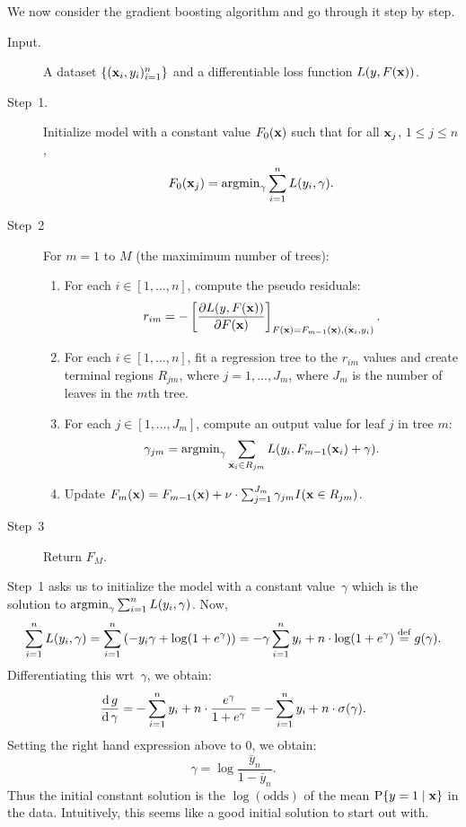 We now consider the gradient boosting algorithm and go through it step by step. 
\begin{description}
    \item[Input.] A dataset $\{(\mathbf{x}_i, y_i)_{i = 1}^{n}\}$ and a 
        differentiable loss function $L(y, F(\mathbf{x}))$.
    
    \item[Step~1.] Initialize model with a constant value $F_0(\mathbf{x})$ such
        that for all $\mathbf{x}_j$, $1 \leq j \leq n$,
        \[
            F_0(\mathbf{x}_j) = \operatorname{argmin}_{\gamma} \sum_{i = 1}^{n} L(y_i, \gamma).
        \]   
    \item[Step~2] For $m = 1$ to $M$ (the maximimum number of trees):
        \begin{enumerate}
            \item For each $i \in [1, \ldots, n]$, compute the pseudo residuals:
                \[
                    r_{i m} = 
                            - \left [ 
                                \frac{\partial L(y, F(\mathbf{x}))}{\partial F(\mathbf{x})} 
                              \right ]_{F(\mathbf{x}) = F_{m - 1}(\mathbf{x}), (\mathbf{x}_i, y_i)}.
                \]
            \item For each $i \in [1, \ldots, n]$, fit a regression tree to the 
                $r_{i m}$ values and create terminal regions $R_{j m}$, where 
                $j = 1, \ldots, J_m$, where $J_m$ is the number of leaves in the 
                $m$th tree.
            \item For each $j \in [1, \ldots, J_m]$, compute an output value for 
                leaf $j$ in tree $m$:
                \[
                    \gamma_{j m} = \operatorname{argmin}_{\gamma} 
                            \sum_{\mathbf{x}_i \in R_{j m}} L(y_i, F_{m - 1}(\mathbf{x}_i) + \gamma).
                \]
            \item Update $F_m(\mathbf{x}) = F_{m - 1}(\mathbf{x}) + 
                \nu \cdot \sum_{j = 1}^{J_m} \gamma_{j m} I(\mathbf{x} \in R_{j m})$.
        \end{enumerate}
    \item[Step~3] Return $F_M$.
\end{description}

Step~1 asks us to initialize the model with a constant value~$\gamma$ which 
is the solution to $\operatorname{argmin}_{\gamma} \sum_{i = 1}^{n} L(y_i, \gamma)$. Now, 
\[
    \sum_{i =1}^{n} L(y_i, \gamma) 
        = \sum_{i = 1}^n \left ( -y_i \gamma + \log (1 + e^{\gamma}) \right )
        = - \gamma \sum_{i = 1}^{n} y_i + n \cdot \log (1 + e^{\gamma}) 
        \stackrel{\text{def}}{=} g(\gamma).
\]
Differentiating this wrt~$\gamma$, we obtain:
\[
    \frac{\operatorname{d} g}{\operatorname{d} \gamma} = - \sum_{i = 1}^n y_i + n \cdot \frac{e^{\gamma}}{1 + e^{\gamma}} 
        = - \sum_{i = 1}^n y_i + n \cdot \sigma(\gamma).  
\]
Setting the right hand expression above to $0$, we obtain:
\[
    \gamma = \log \frac{\bar{y}_n}{1 - \bar{y}_n}.
\]
Thus the initial constant solution is the $\log (\text{odds})$ of the mean 
$\operatorname{P} \{y = 1 \mid \mathbf{x} \}$ in the data. Intuitively, this seems like a good 
initial solution to start out with.

